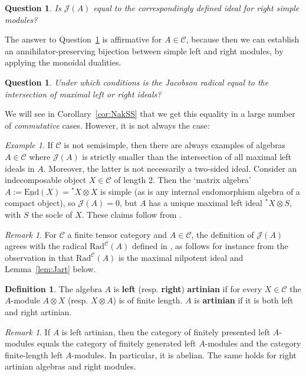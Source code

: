 \documentclass[11pt]{amsart}
\newcommand{\uEnd}{\underline{\mathrm{End}}}
\def\JJ{\mathcal{J}}
\def\cC{\mathscr{C}}
\newtheorem{question}[thm]{Question}
\theoremstyle{definition}
\newtheorem{definition}[thm]{Definition}
\theoremstyle{remark}
\newtheorem{remark}[thm]{Remark}
\newtheorem{example}[thm]{Example}
\numberwithin{equation}{section}
\begin{document}
\begin{question}\label{q:J}
    Is $\JJ(A)$ equal to the correspondingly defined ideal for right simple modules? 
\end{question}
The answer to Question~\ref{q:J} is affirmative for $A\in\cC$, because then we can establish an annihilator-preserving bijection between simple left and right modules, by applying the monoidal dualities.


\begin{question}
    Under which conditions is the Jacobson radical equal to the intersection of maximal left or right ideals?
\end{question}

We will see in Corollary~\ref{cor:NakSS} that we get this equality in a large number of \emph{commutative} cases. However, it is not always the case:
\begin{example}
    If $\cC$ is not semisimple, then there are always examples of algebras $A\in\cC$ where $\JJ(A)$ is strictly smaller than the intersection of all maximal left ideals in $A$. Moreover, the latter is not necessarily a two-sided ideal. Consider an indecomposable object $X\in\cC$ of length $2$. Then the `matrix algebra' $A:=\uEnd(X)= {^*}X\otimes X$ is simple (as is any internal endomorphism algebra of a compact object), so $\JJ(A)=0$, but $A$ has a unique maximal left ideal ${^*}X\otimes S$, with $S$ the socle of $X$. These claims follow from \cite[Example~7.10.2]{EGNO}.
\end{example}


\begin{remark}
For $\cC$ a finite tensor category and $A\in\cC$, the definition of $\JJ(A)$ agrees with the radical $\mathrm{Rad}^{\cC}(A)$ defined in \cite{CSZ}, as follows for instance from the observation in \cite[Proposition~6.12]{CSZ} that $\mathrm{Rad}^{\cC}(A)$ is the maximal nilpotent ideal and Lemma~\ref{lem:Jart} below.


    
\end{remark}



\begin{definition}
  The algebra  $A$ is {\bf left} (resp. {\bf right}) {\bf artinian} if for every $X\in\cC$ the $A$-module $A\otimes X$ (resp. $X\otimes A$) is of finite length. $A$ is {\bf artinian} if it is both left and right artinian. 
\end{definition}


\begin{remark}
    If $A$ is left artinian, then the category of finitely presented left $A$-modules equals the category of finitely generated left $A$-modules and the category finite-length left $A$-modules. In particular, it is abelian. The same holds for right artinian algebras and right modules.
\end{remark}
\end{document}
